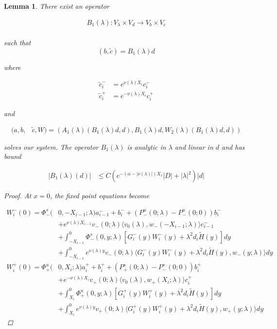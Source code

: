 \documentclass[12pt]{article}
\newtheorem{lemma}{Lemma}
\begin{document}

\begin{lemma}
There exist an operator

\begin{align*}
B_1(\lambda): V_\lambda \times V_d \rightarrow V_b \times V_c \\
\end{align*}

such that 
\[
(b, \tilde{c}) = B_1(\lambda)d
\]

where

\begin{align*}
\tilde{c}_i^- &= e^{\nu(\lambda)X_i} c_i^- \\
\tilde{c}_i^+ &= e^{-\nu(\lambda)X_i} c_i^+
\end{align*}

and

\begin{align*}
(a,b,&\tilde{c}, W) 
= (A_1(\lambda)(B_1(\lambda)d, d), B_1(\lambda)d, W_2(\lambda)(B_1(\lambda)d, d))
\end{align*}

solves our system. The operator $B_1(\lambda)$ is analytic in $\lambda$ and linear in $d$ and has bound

\begin{align*}
|B_1(\lambda)(d)| &\leq C ( e^{-(\alpha - |\nu(\lambda)|) X_1} |D| + |\lambda|^2 )|d|
\end{align*}

\begin{proof}

At $x = 0$, the fixed point equations become

\begin{align*}
W_i^-(0) = \Phi^s_-(&0, -X_{i-1}; \lambda)a_{i-1}^- + b_i^- + (P^u_-(0; \lambda) - P^u_-(0; 0))b_i^- \\
&+ e^{\nu(\lambda)X_{i-1}} v_-(0; \lambda) \langle v_0(\lambda), w_-(-X_{i-1}; \lambda) \rangle c_{i-1}^- \\
&+ \int_{-X_{i-1}}^0 \Phi^s_-(0, y; \lambda) [ G_i^-(y)W_i^-(y) + \lambda^2 d_i \tilde{H}(y) ] dy \\
&+ \int_{-X_{i-1}}^0
e^{\nu(\lambda)y} v_-(0; \lambda) \langle G_i^-(y)W_i^-(y) + \lambda^2 d_i \tilde{H}(y), w_-(y; \lambda) \rangle dy \\
W_i^+(0) = \Phi^u_+(&0, X_i; \lambda)a_i^+ + b_i^+ + (P^s_+(0; \lambda) - P^s_-(0; 0))b_i^+ \\
&+ e^{-\nu(\lambda)  X_i} v_+(0; \lambda) \langle v_0(\lambda), w_+(X_i; \lambda) \rangle c_i^+ \\
&+ \int_{X_i}^0 \Phi^u_+(0, y; \lambda) [ G_i^+(y)W_i^+(y) + \lambda^2 d_i \tilde{H}(y) ] dy \\
&+ \int_{X_i}^0 e^{\nu(\lambda)y} v_+(0; \lambda) \langle G_i^+(y)W_i^+(y) + \lambda^2 d_i \tilde{H}(y), w_+(y; \lambda) \rangle dy
\end{align*}


\end{proof}
\end{lemma}
\end{document}
